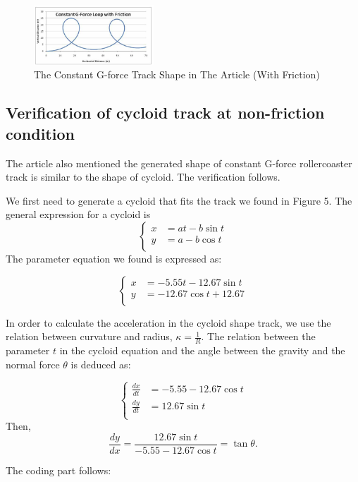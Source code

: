 \documentclass{article}
\begin{document}
\begin{figure}[H]
    \centering
    \includegraphics[width=0.4\textwidth]{7.png}
    \caption{The Constant G-force Track Shape in The Article (With Friction)}
    \end{figure}      
    
\subsection{Verification of cycloid track at non-friction condition}
The article also mentioned the generated shape of constant G-force rollercoaster track is similar to the shape of cycloid. The verification follows.

We first need to generate a cycloid that fits the track we found in Figure 5. The general expression for a cycloid is
$$ \left\{
\begin{aligned}
x & = at-b\sin t \\
y & = a-b\cos t \\
\end{aligned}
\right.

$$ 
The parameter equation we found is expressed as:

$$ \left\{
\begin{aligned}
x & = -5.55t-12.67\sin t \\
y & = -12.67\cos t +12.67 \\
\end{aligned}
\right.
$$

In order to calculate the acceleration in the cycloid shape track, we use the relation between curvature and radius, $\kappa=\frac{1}{R}$. The relation between the parameter $t$ in the cycloid equation and the angle between the gravity and the normal force $\theta$ is deduced as:

$$ \left\{
\begin{aligned}
\frac{dx}{dt} & = -5.55-12.67\cos t \\
\frac{dy}{dt} & = 12.67\sin t \\
\end{aligned}
\right.
$$
Then,
$$
\frac{dy}{dx}=\frac{12.67\sin t}{-5.55-12.67\cos t}=\tan {\theta}.
$$

The coding part follows:
\end{document}
